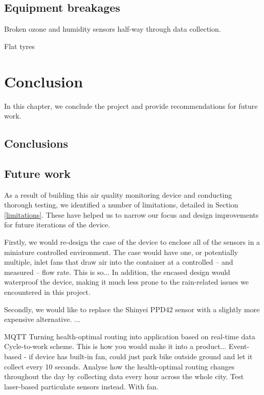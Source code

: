 \documentclass[11pt,twosided,a4paper]{report}
\begin{document}
\section{Equipment breakages}

Broken ozone and humidity sensors half-way through data collection.

Flat tyres




\chapter{Conclusion} \label{chap:conclusion}

In this chapter, we conclude the project and provide recommendations for future work.

\section{Conclusions}

\section{Future work}

As a result of building this air quality monitoring device and conducting thorough testing, we identified a number of limitations, detailed in Section \ref{limitations}. These have helped us to narrow our focus and design improvements for future iterations of the device.

Firstly, we would re-design the case of the device to enclose all of the sensors in a miniature controlled environment. The case would have one, or potentially multiple, inlet fans that draw air into the container at a controlled -- and measured -- flow rate. This is so... In addition, the encased design would waterproof the device, making it much less prone to the rain-related issues we encountered in this project.

Secondly, we would like to replace the Shinyei PPD42 sensor with a slightly more expensive alternative. ...

MQTT
Turning health-optimal routing into application based on real-time data
Cycle-to-work scheme.
This is how you would make it into a product...
Event-based - if device has built-in fan, could just park bike outside ground and let it collect every 10 seconds.
Analyse how the health-optimal routing changes throughout the day by collecting data every hour across the whole city.
Test laser-based particulate sensors instead. With fan.
\end{document}
